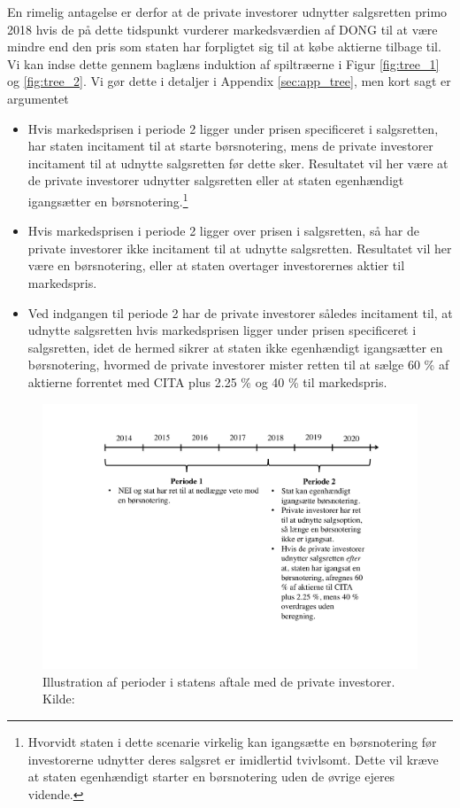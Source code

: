 \documentclass{article}
\begin{document}
En rimelig antagelse er derfor at de private investorer udnytter salgsretten primo 2018 hvis de på dette tidspunkt vurderer markedsværdien af DONG til at være mindre end den pris som staten har forpligtet sig til at købe aktierne tilbage til. Vi kan indse dette gennem baglæns induktion af spiltræerne i Figur \ref{fig:tree_1} og \ref{fig:tree_2}. Vi gør dette i detaljer i Appendix \ref{sec:app_tree}, men kort sagt er argumentet

\begin{itemize}
	\item Hvis markedsprisen i periode 2 ligger under prisen specificeret i salgsretten, har staten incitament til at starte børsnotering, mens de private investorer incitament til at udnytte salgsretten før dette sker. Resultatet vil her være at de private investorer udnytter salgsretten eller at staten egenhændigt igangsætter en børsnotering.\footnote{Hvorvidt staten i dette scenarie virkelig kan igangsætte en børsnotering før investorerne udnytter deres salgsret er imidlertid tvivlsomt. Dette vil kræve at staten egenhændigt starter en børsnotering uden de øvrige ejeres vidende.}
	\item Hvis markedsprisen i periode 2 ligger over prisen i salgsretten, så har de private investorer ikke incitament til at udnytte salgsretten. Resultatet vil her være en børsnotering, eller at staten overtager investorernes aktier til markedspris.
	\item Ved indgangen til periode 2 har de private investorer således incitament til, at udnytte salgsretten hvis markedsprisen ligger under prisen specificeret i salgsretten, idet de hermed sikrer at staten ikke egenhændigt igangsætter en børsnotering, hvormed de private investorer mister retten til at sælge 60 \% af aktierne forrentet med CITA plus 2.25 \% og 40 \% til markedspris.
\end{itemize} 

\begin{figure}
\includegraphics[scale=0.6]{../figs/perioder}
\caption{Illustration af perioder i statens aftale med de private investorer. Kilde: \citet{FM2013a}}
\label{fig:comp}
\end{figure}
\end{document}
